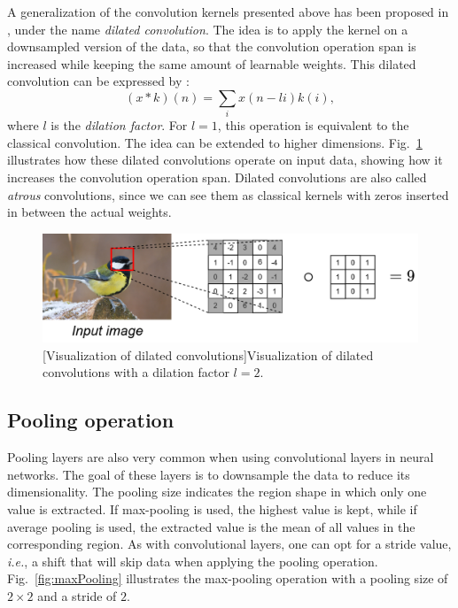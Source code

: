 A generalization of the convolution kernels presented above has been proposed in \cite{yu_multi-scale_2016}, under the name \textit{dilated convolution}. The idea is to apply the kernel on a downsampled version of the data, so that the convolution operation span is increased while keeping the same amount of learnable weights. This dilated convolution can be expressed by \cite{yu_multi-scale_2016}:
\begin{equation}
    (x * k)(n) = \sum_{i} x(n-li)k(i),
\end{equation}
where $l$ is the \textit{dilation factor}. For $l=1$, this operation is equivalent to the classical convolution. The idea can be extended to higher dimensions. Fig.~\ref{fig:dilatedConvolutions} illustrates how these dilated convolutions operate on input data, showing how it increases the convolution operation span. Dilated convolutions are also called \textit{atrous} convolutions, since we can see them as classical kernels with zeros inserted in between the actual weights.

\begin{figure}[t]
    \begin{center}
    \includegraphics[width=1.\linewidth]{Images/chap3/dilatedConvolutions.png}
    [Visualization of dilated convolutions]{Visualization of dilated convolutions with a dilation factor $l=2$.}
    \label{fig:dilatedConvolutions}
    \end{center}
\end{figure}

\subsection{Pooling operation}

Pooling layers are also very common when using convolutional layers in neural networks. The goal of these layers is to downsample the data to reduce its dimensionality. The pooling size indicates the region shape in which only one value is extracted. If max-pooling is used, the highest value is kept, while if average pooling is used, the extracted value is the mean of all values in the corresponding region. As with convolutional layers, one can opt for a stride value, \emph{i.e.}, a shift that will skip data when applying the pooling operation. Fig.~\ref{fig:maxPooling} illustrates the max-pooling operation with a pooling size of $2 \times 2$ and a stride of $2$.

